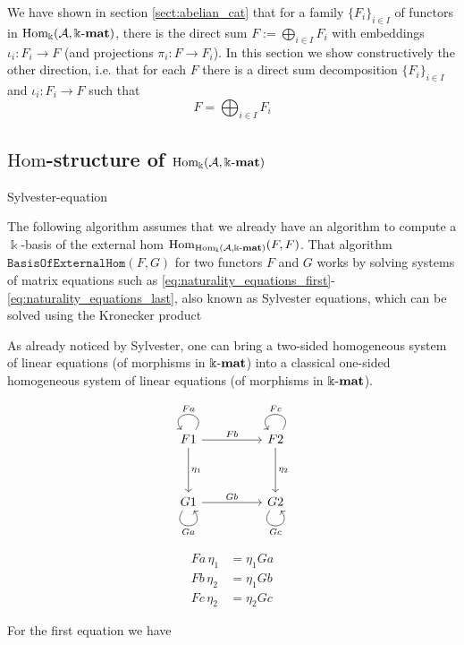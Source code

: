 


We have shown in section \ref{sect:abelian_cat} that for a family $\{F_{i}\}_{i\in I}$ of functors in $\mathrm{Hom_{\Bbbk}}(\mathcal{A},\Bbbk\textnormal{-}\mathbf{mat})$, there is the
direct sum $F := \bigoplus_{i\in I} F_{i}$ with embeddings $\iota_{i} : F_{i} \rightarrow F$ (and projections $\pi_{i} : F \rightarrow F_{i}$).
In this section we show constructively the other direction, i.e. that for each $F$ there is a direct sum decomposition
$\{F_{i}\}_{i\in I}$ and $\iota_{i} : F_{i} \rightarrow F$ such that
\[
F = \bigoplus_{i\in I} F_{i}
\]


\subsection{$\mathrm{Hom}$-structure of $\mathrm{Hom_{\Bbbk}}(\mathcal{A},\Bbbk\textnormal{-}\mathbf{mat})$}

Sylvester-equation

The following algorithm assumes that we already have an algorithm to compute a $\Bbbk$-basis of the external hom
$\mathrm{Hom}_{\mathrm{Hom_{\Bbbk}}(\mathcal{A},\Bbbk\textnormal{-}\mathbf{mat})}(F,F)$.
That algorithm $\mathtt{BasisOfExternalHom}( F, G )$ for two functors $F$ and $G$ works by solving systems of matrix equations such as
\eqref{eq:naturality_equations_first}-\eqref{eq:naturality_equations_last}, also known as Sylvester equations, which can be solved using the
Kronecker product

As already noticed by Sylvester, one can bring a two-sided homogeneous system of linear equations (of morphisms in $\Bbbk\textnormal{-}\mathbf{mat}$) into a classical
one-sided homogeneous system of linear equations (of morphisms in $\Bbbk\textnormal{-}\mathbf{mat}$). 

\[
\begin{tikzcd}
F1 \arrow["Fa"', loop, distance=2em, in=125, out=55] \arrow[rr, "Fb"] \arrow[dd, "\eta_{1}"]
&  & F2 \arrow["Fc"', loop, distance=2em, in=125, out=55] \arrow[dd, "\eta_{2}"] \\
&  &                                                                                 \\
G1 \arrow["Ga"', loop, distance=2em, in=305, out=235] \arrow[rr, "Gb"]
&  & G2 \arrow["Gc"', loop, distance=2em, in=305, out=235]
\end{tikzcd}
\]

\begin{align}
Fa\,\eta_{1} &= \eta_{1} Ga \\
Fb\,\eta_{2} &= \eta_{1} Gb \\
Fc\,\eta_{2} &= \eta_{2} Gc
\end{align}

For the first equation we have


